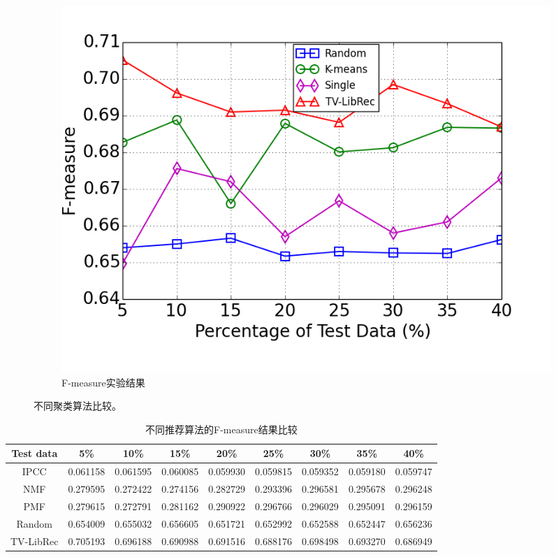 \begin{figure}
\begin{subfigure}[b]{0.5\textwidth}
		\includegraphics[width=\textwidth]{figures/cluster_comp_f}
		\caption{F-measure实验结果}
	\end{subfigure}
	\caption{不同聚类算法比较。}
\end{figure}
\begin{table}
\small
\setlength{\tabcolsep}{3.8pt}
\centering
\caption{不同推荐算法的F-measure结果比较}
\begin{tabular}{c c c c c c c c c}
\hline\hline
Test data & 5\% & 10\% & 15\% & 20\% & 25\% & 30\% & 35\% & 40\% \\
\hline
IPCC & 0.061158 & 0.061595 & 0.060085 & 0.059930 & 0.059815 & 0.059352 & 0.059180 & 0.059747 \\

NMF & 0.279595 & 0.272422 & 0.274156 & 0.282729 & 0.293396 & 0.296581 & 0.295678 & 0.296248 \\

PMF & 0.279615 & 0.272791 & 0.281162 & 0.290922 & 0.296766 & 0.296029 & 0.295091 & 0.296159  \\

Random & 0.654009 & 0.655032 & 0.656605 & 0.651721 & 0.652992 & 0.652588 & 0.652447 & 0.656236 \\

TV-LibRec & 0.705193 & 0.696188 & 0.690988 & 0.691516 & 0.688176 & 0.698498 & 0.693270 & 0.686949 \\
\hline\hline
\end{tabular}
\end{table}
